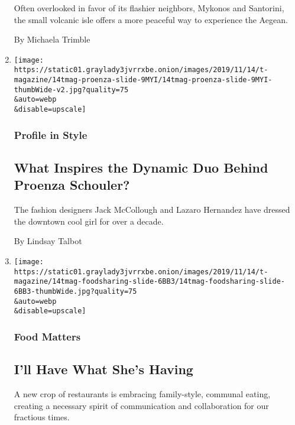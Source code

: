 \begin{enumerate}
  Often overlooked in favor of its flashier neighbors, Mykonos and
  Santorini, the small volcanic isle offers a more peaceful way to
  experience the Aegean.

  By Michaela Trimble
\item
  \href{/2019/11/13/t-magazine/proenza-schouler-inspiration.html}{}

  \texttt{[image: https://static01.graylady3jvrrxbe.onion/images/2019/11/14/t-magazine/14tmag-proenza-slide-9MYI/14tmag-proenza-slide-9MYI-thumbWide-v2.jpg?quality=75\\\&auto=webp\\\&disable=upscale]}

  \hypertarget{profile-in-style}{%
  \subsubsection{Profile in Style}\label{profile-in-style}}

  \hypertarget{what-inspires-the-dynamic-duo-behind-proenza-schouler}{%
  \subsection{What Inspires the Dynamic Duo Behind Proenza
  Schouler?}\label{what-inspires-the-dynamic-duo-behind-proenza-schouler}}

  The fashion designers Jack McCollough and Lazaro Hernandez have
  dressed the downtown cool girl for over a decade.

  By Lindsay Talbot
\item
  \href{/2019/11/13/t-magazine/food-sharing-restaurants.html}{}

  \texttt{[image: https://static01.graylady3jvrrxbe.onion/images/2019/11/14/t-magazine/14tmag-foodsharing-slide-6BB3/14tmag-foodsharing-slide-6BB3-thumbWide.jpg?quality=75\\\&auto=webp\\\&disable=upscale]}

  \hypertarget{food-matters}{%
  \subsubsection{Food Matters}\label{food-matters}}

  \hypertarget{ill-have-what-shes-having}{%
  \subsection{I'll Have What She's
  Having}\label{ill-have-what-shes-having}}

  A new crop of restaurants is embracing family-style, communal eating,
  creating a necessary spirit of communication and collaboration for our
  fractious times.


\end{enumerate}
